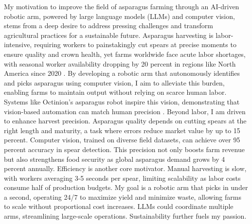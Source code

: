 My motivation to improve the field of asparagus farming through an AI-driven robotic arm, powered by large language models (LLMs) and computer vision, stems from a deep desire to address pressing challenges and transform agricultural practices for a sustainable future. Asparagus harvesting is labor-intensive, requiring workers to painstakingly cut spears at precise moments to ensure quality and crown health, yet farms worldwide face acute labor shortages, with seasonal worker availability dropping by 20 percent in regions like North America since 2020 . By developing a robotic arm that autonomously identifies and picks asparagus using computer vision, I aim to alleviate this burden, enabling farms to maintain output without relying on scarce human labor. Systems like Octinion’s asparagus robot inspire this vision, demonstrating that vision-based automation can match human precision . Beyond labor, I am driven to enhance harvest precision. Asparagus quality depends on cutting spears at the right length and maturity, a task where errors reduce market value by up to 15 percent. Computer vision, trained on diverse field datasets, can achieve over 95 percent accuracy in spear detection. This precision not only boosts farm revenue but also strengthens food security as global asparagus demand grows by 4 percent annually. Efficiency is another core motivator. Manual harvesting is slow, with workers averaging 3-5 seconds per spear, limiting scalability as labor costs consume half of production budgets. My goal is a robotic arm that picks in under a second, operating 24/7 to maximize yield and minimize waste, allowing farms to scale without proportional cost increases. LLMs could coordinate multiple arms, streamlining large-scale operations. Sustainability further fuels my passion.

